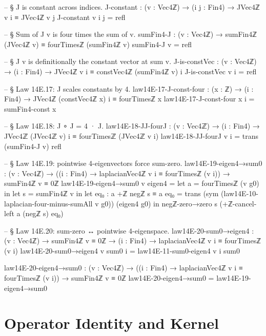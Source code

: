 \documentclass[11pt,a4paper]{book}
\begin{document}
\begin{code}
-- § J is constant across indices.
J-constant : (v : Vec4ℤ) → (i j : Fin4) → JVec4ℤ v i ≡ JVec4ℤ v j
J-constant v i j = refl

-- § Sum of J v is four times the sum of v.
sumFin4-J : (v : Vec4ℤ) → sumFin4ℤ (JVec4ℤ v) ≡ fourTimesℤ (sumFin4ℤ v)
sumFin4-J v = refl

-- § J v is definitionally the constant vector at sum v.
J-is-constVec : (v : Vec4ℤ) → (i : Fin4) → JVec4ℤ v i ≡ constVec4ℤ (sumFin4ℤ v) i
J-is-constVec v i = refl

-- § Law 14E.17: J scales constants by 4.
law14E-17-J-const-four : (x : ℤ) → (i : Fin4) →
  JVec4ℤ (constVec4ℤ x) i ≡ fourTimesℤ x
law14E-17-J-const-four x i = sumFin4-const x

-- § Law 14E.18: J ∘ J = 4 · J.
law14E-18-JJ-fourJ : (v : Vec4ℤ) → (i : Fin4) →
  JVec4ℤ (JVec4ℤ v) i ≡ fourTimesℤ (JVec4ℤ v i)
law14E-18-JJ-fourJ v i =
  trans (sumFin4-J v) refl

-- § Law 14E.19: pointwise 4-eigenvectors force sum-zero.
law14E-19-eigen4→sum0 : (v : Vec4ℤ) → ((i : Fin4) → laplacianVec4ℤ v i ≡ fourTimesℤ (v i)) →
  sumFin4ℤ v ≡ 0ℤ
law14E-19-eigen4→sum0 v eigen4 =
  let a = fourTimesℤ (v g0) in
  let s = sumFin4ℤ v in
  let eq₀ : a +ℤ negℤ s ≡ a
      eq₀ =
        trans
          (sym (law14E-10-laplacian-four-minus-sumAll v g0))
          (eigen4 g0)
  in
  negℤ-zero→zero s (+ℤ-cancel-left a (negℤ s) eq₀)

-- § Law 14E.20: sum-zero ↔ pointwise 4-eigenspace.
law14E-20-sum0→eigen4 : (v : Vec4ℤ) → sumFin4ℤ v ≡ 0ℤ → (i : Fin4) →
  laplacianVec4ℤ v i ≡ fourTimesℤ (v i)
law14E-20-sum0→eigen4 v sum0 i = law14E-11-sum0-eigen4 v i sum0

law14E-20-eigen4→sum0 : (v : Vec4ℤ) → ((i : Fin4) → laplacianVec4ℤ v i ≡ fourTimesℤ (v i)) →
  sumFin4ℤ v ≡ 0ℤ
law14E-20-eigen4→sum0 = law14E-19-eigen4→sum0
\end{code}

\section{Operator Identity and Kernel}
\end{document}
